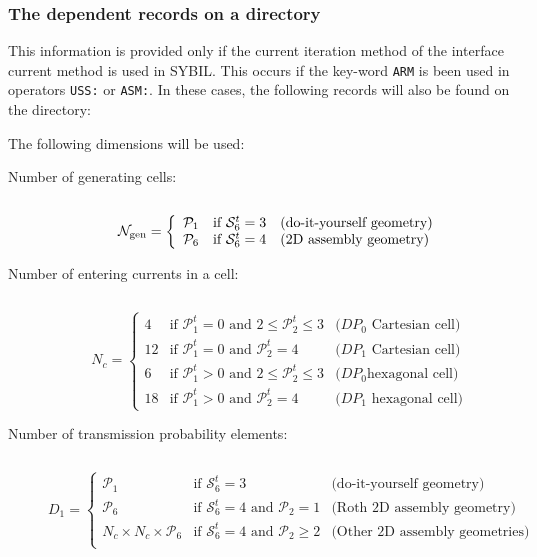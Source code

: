 \subsubsection{The  dependent records on a
 directory}\label{sect:SYBILgrpdiringdir}

This information is provided only if the current iteration method of the
interface current method is used in SYBIL. This occurs if the key-word {\tt ARM}
is been used in operators {\tt USS:} or {\tt ASM:}. In these cases, the following records will
also be found on the  directory:

\vskip 0.2cm

The following dimensions will be used:
\begin{description}

\item[Number of generating cells:] $~$

\begin{displaymath}
\mathcal{N}_{\rm gen} = \left\{
\begin{array}{rll}
\mathcal{P}_1 & \textrm{if~} \mathcal{S}_6^t=3 & \textrm{(do-it-yourself geometry)} \\
\mathcal{P}_6 & \textrm{if~} \mathcal{S}_6^t=4 & \textrm{(2D assembly geometry)}
\end{array} \right.
\end{displaymath}

\item[Number of entering currents in a cell:] $~$

\begin{displaymath}
N_c = \left\{
\begin{array}{rll}
4  & \textrm{if~} \mathcal{P}_1^t=0 \textrm{~and~} 2\le\mathcal{P}_2^t\le 3 & \textrm{($DP_0$ Cartesian cell)} \\
12 & \textrm{if~} \mathcal{P}_1^t=0 \textrm{~and~} \mathcal{P}_2^t=4 &
\textrm{($DP_1$ Cartesian cell)} \\
6  & \textrm{if~} \mathcal{P}_1^t>0 \textrm{~and~} 2\le\mathcal{P}_2^t\le 3 & \textrm{($DP_0$
hexagonal cell)} \\
18 & \textrm{if~} \mathcal{P}_1^t>0 \textrm{~and~} \mathcal{P}_2^t=4 &
\textrm{($DP_1$ hexagonal cell)}
\end{array} \right.
\end{displaymath}

\item[Number of transmission probability elements:] $~$

\begin{displaymath}
D_1 = \left\{
\begin{array}{rll}
\mathcal{P}_1 & \textrm{if~} \mathcal{S}_6^t=3 & \textrm{(do-it-yourself geometry)} \\
\mathcal{P}_6 & \textrm{if~} \mathcal{S}_6^t=4 \textrm{~and~} {\mathcal{P}_2=1} & \textrm{(Roth 2D assembly geometry)} \\
N_c \times N_c \times \mathcal{P}_6 & \textrm{if~} \mathcal{S}_6^t=4 \textrm{~and~}
{\mathcal{P}_2\ge 2} & \textrm{(Other 2D assembly geometries)} \\
\end{array} \right.
\end{displaymath}


\end{description}
